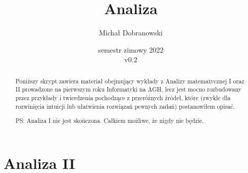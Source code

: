 \documentclass[11pt]{scrartcl}
\title{Analiza}
\author{Michał Dobranowski}
\date{semestr zimowy 2022 \\ v0.2}
\begin{document}
    \maketitle
    \begin{abstract}
        Poniższy skrypt zawiera materiał obejmujący wykłady z Analizy matematycznej I oraz II prowadzone na pierwszym roku Informatyki na AGH, lecz jest mocno rozbudowany przez przykłady i twierdzenia pochodzące z przeróżnych źródeł, które (zwykle dla rozwinięcia intuicji lub ułatwienia rozwiązań pewnych zadań) postanowiłem opisać.

        PS: Analiza I nie jest skończona. Całkiem możliwe, że nigdy nie będzie.
    \end{abstract}
    \tableofcontents
    \eject






    \part{Analiza II}
\end{document}
